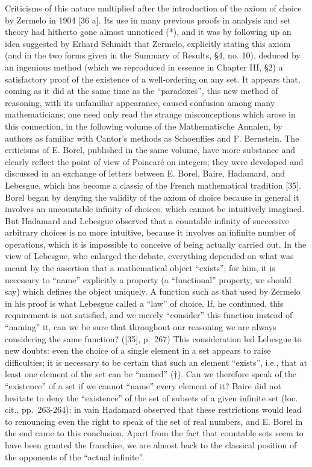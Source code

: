 Criticisms of this nature multiplied after the introduction of the axiom of choice by Zermelo in 1904 {[}36 a{]}. Its use in many previous proofs in analysis and set theory had hitherto gone almost unnoticed (*), and it was by following up an idea suggested by Erhard Schmidt that Zermelo, explicitly stating this axiom (and in the two forms given in the Summary of Results, §4, no. 10), deduced by an ingenious method (which we reproduced in essence in Chapter III, §2) a satisfactory proof of the existence of a well-ordering on any set. It appears that, coming as it did at the same time as the ``paradoxes'', this new method of reasoning, with its unfamiliar appearance, caused confusion among many mathematicians; one need only read the strange misconceptions which arose in this connection, in the following volume of the Mathematische Annalen, by authors as familiar with Cantor's methods as Schoenflies and F. Bernstein. The criticisms of E. Borel, published in the same volume, have more substance and clearly reflect the point of view of Poincaré on integers; they were developed and discussed in an exchange of letters between E. Borel, Baire, Hadamard, and Lebesgue, which has become a classic of the French mathematical tradition {[}35{]}. Borel began by denying the validity of the axiom of choice because in general it involves an uncountable infinity of choices, which cannot be intuitively imagined. But Hadamard and Lebesgue observed that a countable infinity of successive arbitrary choices is no more intuitive, because it involves an infinite number of operations, which it is impossible to conceive of being actually carried out. In the view of Lebesgue, who enlarged the debate, everything depended on what was meant by the assertion that a mathematical object ``exists''; for him, it is necessary to ``name'' explicitly a property (a ``functional'' property, we should say) which defines the object uniquely. A function such as that used by Zermelo in his proof is what Lebesgue called a ``law'' of choice. If, he continued, this requirement is not satisfied, and we merely ``consider'' this function instead of ``naming'' it, can we be sure that throughout our reasoning we are always considering the same function? ({[}35{]}, p.~267) This consideration led Lebesgue to new doubts: even the choice of a single element in a set appears to raise difficulties; it is necessary to be certain that such an element ``exists'', i.e., that at least one element of the set can be ``named'' (†). Can we therefore speak of the ``existence'' of a set if we cannot ``name'' every element of it? Baire did not hesitate to deny the ``existence'' of the set of subsets of a given infinite set (loc. cit., pp.~263-264); in vain Hadamard observed that these restrictions would lead to renouncing even the right to speak of the set of real numbers, and E. Borel in the end came to this conclusion. Apart from the fact that countable sets seem to have been granted the franchise, we are almost back to the classical position of the opponents of the ``actual infinite''.

